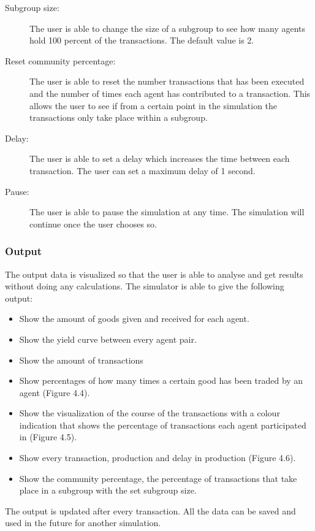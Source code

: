 \documentclass[twoside,openright]{uva-bachelor-thesis}
\begin{document}
\begin{description}
\item[Subgroup size:] The user is able to change the size of a subgroup to see how many agents hold 100 percent of the transactions. The default value is 2.
\item[Reset community percentage:] The user is able to reset the number transactions that has been executed and the number of times each agent has contributed to a transaction. This allows the user to see if from a certain point in the simulation the transactions only take place within a subgroup.
\item[Delay:] The user is able to set a delay which increases the time between each transaction. The user can set a maximum delay of 1 second. 
\item[Pause:] The user is able to pause the simulation at any time. The simulation will continue once the user chooses so.
\end{description}


\subsubsection{Output}
The output data is visualized so that the user is able to analyse and get results without doing any calculations. The simulator is able to give the following output:
\begin{itemize}
\item Show the amount of goods given and received for each agent.
\item Show the yield curve between every agent pair.
\item Show the amount of transactions
\item Show percentages of how many times a certain good has been traded by an agent (Figure 4.4).
\item Show the visualization of the course of the transactions with a colour indication that shows the percentage of transactions each agent participated in (Figure 4.5). 
\item Show every transaction, production and delay in production (Figure 4.6).
\item Show the community percentage, the percentage of transactions that take place in a subgroup with the set subgroup size.
\end{itemize}

The output is updated after every transaction. All the data can be saved and used in the future for another simulation.
\end{document}
